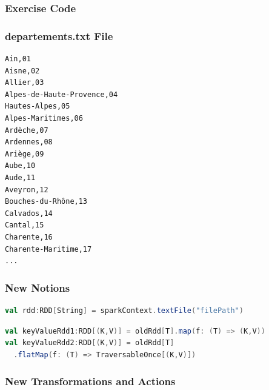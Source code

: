 \documentclass[slidetop,9pt,utf8]{beamer}
\begin{document}
\begin{CJK}{UTF8}{gbsn}
\begin{frame}
\end{frame}

\begin{frame}
  \frametitle{Exercise Code}

  

\end{frame}

\begin{frame}[fragile]
  \frametitle{departements.txt File}

  \begin{verbatim}
Ain,01
Aisne,02
Allier,03
Alpes-de-Haute-Provence,04
Hautes-Alpes,05
Alpes-Maritimes,06
Ardèche,07
Ardennes,08
Ariège,09
Aube,10
Aude,11
Aveyron,12
Bouches-du-Rhône,13
Calvados,14
Cantal,15
Charente,16
Charente-Maritime,17
...
  \end{verbatim}

\end{frame}

\begin{frame}[fragile]
  \frametitle{New Notions}

  \begin{lstlisting}[label=LoadTextFile, caption=Load Text File, language=scala, style=code]
val rdd:RDD[String] = sparkContext.textFile("filePath")
  \end{lstlisting}

  \begin{lstlisting}[label=TransformToKeyValue, caption=Transform RDD to a Key/Value RDD (Also called PairRDD), language=scala, style=code]
val keyValueRdd1:RDD[(K,V)] = oldRdd[T].map(f: (T) => (K,V))
val keyValueRdd2:RDD[(K,V)] = oldRdd[T]
  .flatMap(f: (T) => TraversableOnce[(K,V)])
  \end{lstlisting}

\end{frame}

\begin{frame}

  \frametitle{New Transformations and Actions}


\end{frame}
\end{CJK}
\end{document}
